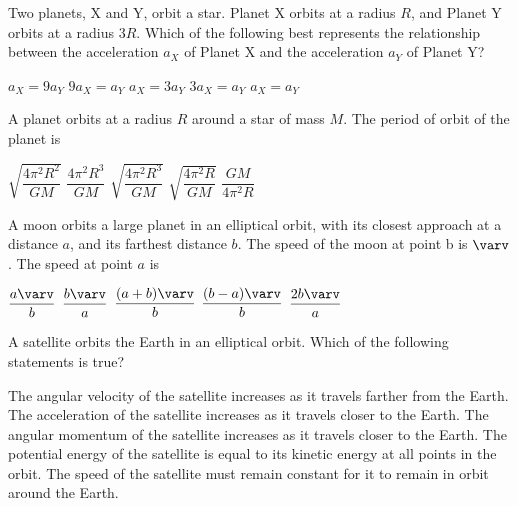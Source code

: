 \documentclass{../../../oss-apphys-exam}
\begin{document}
\begin{multicols*}{2}
\begin{questions}
    \question Two planets, X and Y, orbit a star. Planet X orbits at a radius
    $R$, and Planet Y orbits at a radius $3R$. Which of the following best
    represents the relationship between the acceleration $a_X$ of Planet X and
    the acceleration $a_Y$ of Planet Y?
    \begin{center}
    \end{center}
    \begin{choices}
      \choice $a_X = 9a_Y$
      \choice $9a_X = a_Y$
      \choice $a_X = 3a_Y$
      \choice $3a_X = a_Y$
      \choice $a_X = a_Y$
    \end{choices}
    
    \question A planet orbits at a radius $R$ around a star of mass $M$. The
    period of orbit of the planet is
    \begin{choices}
      \choice $\sqrt{\dfrac{4\pi^2R^2}{GM}}$
      \choice $\dfrac{4\pi^2R^3}{GM}$
      \choice $\sqrt{\dfrac{4\pi^2R^3}{GM}}$
      \choice $\sqrt{\dfrac{4\pi^2R}{GM}}$
      \choice $\dfrac{GM}{4\pi^2R}$
    \end{choices}

    \question A moon orbits a large planet in an elliptical orbit, with its
    closest approach at a distance $a$, and its farthest distance $b$. The
    speed of the moon at point b is $\varv$. The speed at point $a$ is
    \begin{choices}
      \choice $\dfrac{a\varv}{b}$
      \choice $\dfrac{b\varv}{a}$
      \choice $\dfrac{(a+b)\varv}{b}$
      \choice $\dfrac{(b-a)\varv}{b}$
      \choice $\dfrac{2b\varv}{a}$
    \end{choices}

    \question A satellite orbits the Earth in an elliptical orbit. Which of the
    following statements is true?
    \begin{choices}
      \choice The angular velocity of the satellite increases as it travels
      farther from the Earth.
      \choice The acceleration of the satellite increases as it travels closer
      to the Earth.
      \choice The angular momentum of the satellite increases as it travels
      closer to the Earth.
      \choice The potential energy of the satellite is equal to its kinetic
      energy at all points in the orbit.
      \choice The speed of the satellite must remain constant for it to remain
      in orbit around the Earth.
    \end{choices}
    

\end{questions}
\end{multicols*}
\end{document}
